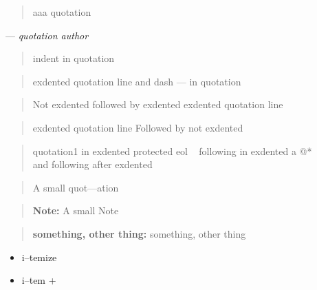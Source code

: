 \documentclass{book}
\begin{document}
\begin{titlepage}
\begin{quote}
aaa quotation
\end{quote}
\begin{center}
--- \emph{quotation author}
\end{center}

\begin{quote}
indent in quotation
\end{quote}

\begin{quote}
exdented quotation line   and dash --- in quotation
\end{quote}

\begin{quote}
Not exdented followed by exdented
exdented quotation line
\end{quote}

\begin{quote}
exdented quotation line
Followed by not exdented 
\end{quote}

\begin{quote}
quotation1
in exdented protected eol \ {}
following
in exdented a @* \leavevmode{}\\ and following
after exdented
\end{quote}

\begin{quote}
\begin{footnotesize}
A small quot---ation
\end{footnotesize}
\end{quote}

\begin{quote}
\begin{footnotesize}
\textbf{Note:} A small Note
\end{footnotesize}
\end{quote}

\begin{quote}
\begin{footnotesize}
\textbf{something, other thing:} something, other thing
\end{footnotesize}
\end{quote}

\begin{itemize}
\item i--temize
\end{itemize}

\begin{itemize}[label=+]
\item i--tem +
\end{itemize}


\end{titlepage}
\end{document}
